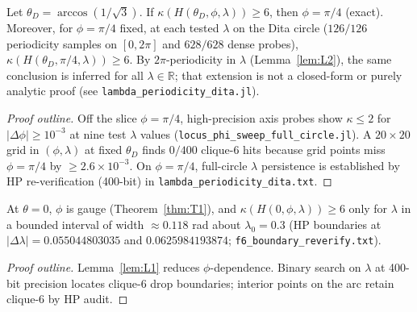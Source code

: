 \begin{proposition}
\label{prop:L5}
Let $\theta_D=\arccos(1/\sqrt3)$.
If $\kappa(H(\theta_D,\phi,\lambda))\ge6$, then $\phi=\pi/4$ (exact).
Moreover, for $\phi=\pi/4$ fixed, at each tested $\lambda$ on the Dita circle ($126/126$ periodicity samples on $[0,2\pi]$ and $628/628$ dense probes), $\kappa(H(\theta_D,\pi/4,\lambda))\ge6$.
By $2\pi$-periodicity in $\lambda$ (Lemma~\ref{lem:L2}), the same conclusion is inferred for all $\lambda\in\mathbb{R}$; that extension is not a closed-form or purely analytic proof (see \texttt{lambda\_periodicity\_dita.jl}).
\end{proposition}

\begin{proof}[Proof outline]
Off the slice $\phi=\pi/4$, high-precision axis probes show $\kappa\le2$ for $|\Delta\phi|\ge10^{-3}$ at nine test $\lambda$ values
(\texttt{locus\_phi\_sweep\_full\_circle.jl}).
A $20\times20$ grid in $(\phi,\lambda)$ at fixed $\theta_D$ finds $0/400$ clique-6 hits because grid points miss $\phi=\pi/4$ by $\ge2.6\times10^{-3}$.
On $\phi=\pi/4$, full-circle $\lambda$ persistence is established by HP re-verification (400-bit) in \texttt{lambda\_periodicity\_dita.txt}.
\end{proof}

\begin{proposition}[Bounded $\lambda$-arc at $\theta=0$]
\label{prop:L6}
At $\theta=0$, $\phi$ is gauge (Theorem~\ref{thm:T1}), and $\kappa(H(0,\phi,\lambda))\ge6$ only for
$\lambda$ in a bounded interval of width $\approx0.118$ rad about $\lambda_0=0.3$
(HP boundaries at $|{\Delta\lambda}|=0.055044803035$ and $0.0625984193874$; \texttt{f6\_boundary\_reverify.txt}).
\end{proposition}

\begin{proof}[Proof outline]
Lemma~\ref{lem:L1} reduces $\phi$-dependence.
Binary search on $\lambda$ at 400-bit precision locates clique-6 drop boundaries; interior points on the arc retain clique-6 by HP audit.
\end{proof}
